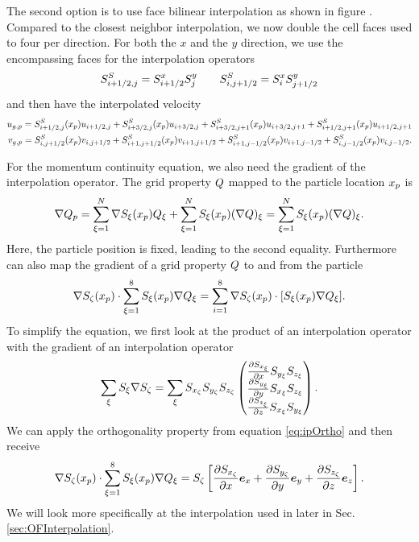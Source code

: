 The second option is to use face bilinear interpolation as shown in figure . Compared to the closest neighbor interpolation, we now double the cell faces used to four per direction. 
For both the $x$ and the $y$ direction, we use the encompassing faces for the interpolation operators
\begin{equation*}
    S_{i+1/2,j}^S = S^x_{i+1/2} S^y_{j} \qquad S_{i,j+1/2}^S = S^x_i S^y_{j+1/2}
\end{equation*}
and then have the interpolated velocity
\begin{align*}
    u_{g,p} = S^S_{i+1/2,j} (x_p) u_{i+1/2,j} + S_{i+3/2,j}^S (x_p) u_{i+3/2,j} + S_{i+3/2,j+1}^S (x_p) u_{i+3/2,j+1} + S^S_{i+1/2,j+1}(x_p)u_{i+1/2,j+1}\\
    v_{g,p} =  S^S_{i,j+1/2} (x_p) v_{i,j+1/2} + S^S_{i+1,j+1/2} (x_p) v_{i+1,j+1/2} + S^S_{i+1,j-1/2} (x_p) v_{i+1,j-1/2}+S^S_{i,j-1/2} (x_p) v_{i,j-1/2}.
\end{align*}

For the momentum continuity equation, we also need the gradient of the interpolation operator.
The grid property $Q$ mapped to the particle location $x_p$ is
\begin{equation*}
    \nabla Q_p = \sum_{\xi =1}^{N} \nabla S_{\xi}(x_p) Q_{\xi} + \sum_{\xi = 1}^N S_{\xi} ( x_p) (\nabla Q)_\xi = \sum_{\xi =1}^N S_{\xi} ( x_p) (\nabla Q)_\xi.
\end{equation*}
Here, the particle position is fixed, leading to the second equality.
Furthermore can also map the gradient of a grid property $Q$ to and from the particle
\begin{equation*}
    \nabla S_\zeta (x_p) \cdot \sum_{\xi =1}^8 S_\xi ( x_p ) \nabla Q_\xi = \sum_{i=1}^8 \nabla S_\zeta ( x_p ) \cdot [S_\xi (x_p) \nabla Q_\xi].
\end{equation*}
To simplify the equation, we first look at the product of an interpolation operator with the gradient of an interpolation operator
\begin{equation*}
    \sum_\xi S_\xi \nabla S_\zeta = \sum_\xi S_{x_\zeta} S_{y_\zeta} S_{z_\zeta} \begin{pmatrix}
        \frac{\partial S_{x_\xi}}{\partial x} S_{y_\xi} S_{z_\xi} \\
        \frac{\partial S_{y_\xi}}{\partial y} S_{x_\xi} S_{z_\xi} \\
        \frac{\partial S_{z_\xi}}{\partial z} S_{x_\xi} S_{y_\xi}
    \end{pmatrix}.
\end{equation*}
We can apply the orthogonality property from equation \eqref{eq:ipOrtho} and then receive
\begin{equation*}
    \nabla S_\zeta ( x_p ) \cdot \sum_{\xi=1}^8 S_\xi ( x_p ) \nabla Q_\xi = S_\zeta \left[ \dfrac{\partial S_{x_\zeta}}{\partial x} \boldsymbol{e}_x + \dfrac{\partial S_{y_\zeta}}{\partial y} \boldsymbol{e}_y + \dfrac{\partial S_{z_\zeta}}{\partial z} \boldsymbol{e}_z\right].
\end{equation*}
We will look more specifically at the interpolation used in \OF later in Sec. \ref{sec:OFInterpolation}.


